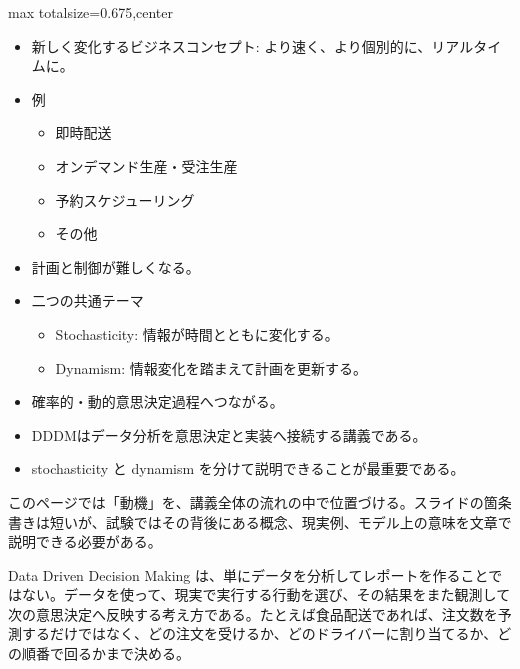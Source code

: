 \clearpage
{}
\begin{adjustbox}{max totalsize={\textwidth}{0.675\textheight},center}
\begin{minipage}{\textwidth}\scriptsize
\begin{minipage}[t]{0.485\textwidth}
\begin{itemize}
\item 新しく変化するビジネスコンセプト: より速く、より個別的に、リアルタイムに。
\item 例
\begin{itemize}
\item 即時配送
\item オンデマンド生産・受注生産
\item 予約スケジューリング
\item その他
\end{itemize}
\item 計画と制御が難しくなる。
\item 二つの共通テーマ
\begin{itemize}
\item Stochasticity: 情報が時間とともに変化する。
\item Dynamism: 情報変化を踏まえて計画を更新する。
\end{itemize}
\item 確率的・動的意思決定過程へつながる。
\end{itemize}
\begin{itemize}
\item DDDMはデータ分析を意思決定と実装へ接続する講義である。
\item stochasticity と dynamism を分けて説明できることが最重要である。
\end{itemize}
\end{minipage}\hfill
\begin{minipage}[t]{0.485\textwidth}
このページでは「動機」を、講義全体の流れの中で位置づける。スライドの箇条書きは短いが、試験ではその背後にある概念、現実例、モデル上の意味を文章で説明できる必要がある。\par
Data Driven Decision Making は、単にデータを分析してレポートを作ることではない。データを使って、現実で実行する行動を選び、その結果をまた観測して次の意思決定へ反映する考え方である。たとえば食品配送であれば、注文数を予測するだけではなく、どの注文を受けるか、どのドライバーに割り当てるか、どの順番で回るかまで決める。\par

\end{minipage}
\end{minipage}
\end{adjustbox}
